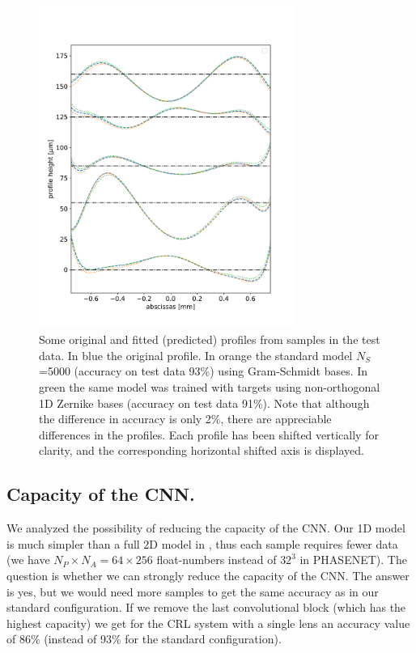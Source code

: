 \documentclass[preprint]{iucr}
\newcommand{\inred}[1]{{\color{red}#1}}
\begin{document}
\begin{figure}\label{fig:v14profiles}
    \includegraphics[width=0.75\textwidth]{figures/figure4.pdf}
    \caption{Some original and fitted (predicted) profiles from samples in the test data.
    \inred{In blue the original profile. In orange the standard model $N_S$=5000 (accuracy on test  data 93\%) using Gram-Schmidt bases. In green the same model was trained with targets using  non-orthogonal 1D Zernike bases (accuracy on test  data 91\%). Note that although the difference in accuracy is only 2\%, there are appreciable differences in the profiles. Each profile has been shifted vertically for clarity, and the corresponding horizontal shifted axis is displayed.
    }
    }
\end{figure}

\subsection{Capacity of the CNN.}
We analyzed the possibility of reducing the capacity of the CNN. Our 1D model is much simpler than a full 2D model in \cite{Saha2020}, thus each sample requires fewer data (we have $N_P\times N_A=64\times 256$ float-numbers instead of $32^3$ in PHASENET). The question is whether we can strongly reduce the capacity of the CNN. The answer is yes, but we would need more samples to get the same accuracy as in our standard configuration. If we remove the last convolutional block (which has the highest capacity) we get for the CRL system with a single lens an accuracy value of 86\% (instead of 93\% for the standard configuration).
\end{document}
